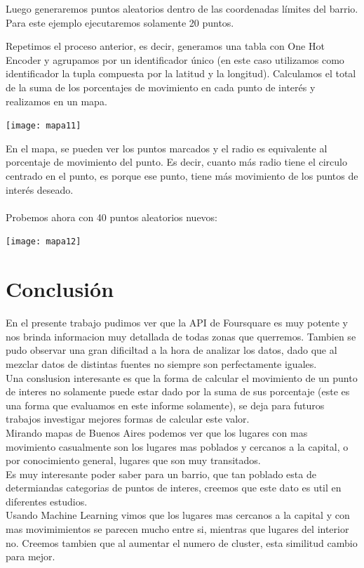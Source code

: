\documentclass[12pt,a4paper]{tesis}
\begin{document}
Luego generaremos puntos aleatorios dentro de las coordenadas límites del barrio. Para este ejemplo ejecutaremos solamente 20 puntos.

Repetimos el proceso anterior, es decir, generamos una tabla con One Hot Encoder y agrupamos por un identificador único (en este caso utilizamos como identificador la tupla compuesta por la latitud y la longitud).  Calculamos el total de la suma de los porcentajes de movimiento en cada punto de interés y realizamos en un mapa.

\centerline{
	\texttt{[image: mapa11]}
}

En el mapa, se pueden ver los puntos marcados y el radio es equivalente al porcentaje de movimiento del punto. Es decir, cuanto más radio tiene el circulo centrado en el punto, es porque ese punto, tiene más movimiento de los puntos de interés deseado. \\ \\

Probemos ahora con 40 puntos aleatorios nuevos: \\ 

\centerline{
	\texttt{[image: mapa12]}
}

\chapter{Conclusión}
En el presente trabajo pudimos ver que la API de Foursquare es muy potente y nos brinda informacion muy detallada de todas zonas que querremos. Tambien se pudo observar una gran dificiltad a la hora de analizar los datos, dado que al mezclar datos de distintas fuentes no siempre son perfectamente iguales. \\
Una conslusion interesante es que la forma de calcular el movimiento de un punto de interes no solamente puede estar dado por la suma de sus porcentaje (este es una forma que evaluamos en este informe solamente), se deja para futuros trabajos investigar mejores formas de calcular este valor. \\
Mirando mapas de Buenos Aires podemos ver que los lugares con mas movimiento casualmente son los lugares mas poblados y cercanos a la capital, o por conocimiento general, lugares que son muy transitados. \\
Es muy interesante poder saber para un barrio, que tan poblado esta de determiandas categorias de puntos de interes, creemos que este dato es util en diferentes estudios. \\
Usando Machine Learning vimos que los lugares mas cercanos a la capital y con mas movimimientos se parecen mucho entre si, mientras que lugares del interior no. Creemos tambien que al aumentar el numero de cluster, esta similitud cambio para mejor. \\
\end{document}
